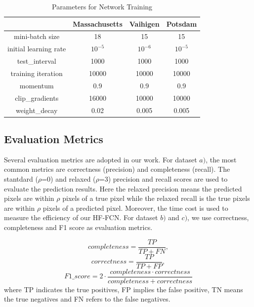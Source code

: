 \begin{table}
\centering
\caption {Parameters for Network Training}
\label{table:Train-Parameter}
\begin{tabular}{c|c|c|c}
\hline
&Massachusetts &Vaihigen &Potsdam\\  \hline
mini-batch size & 18& 15 & 15 \\
initial learning rate & $10^{-5}$ & $10^{-6}$ & $10^{-5}$\\
test\_interval&1000 & 1000 &1000\\
training iteration & 10000 & 10000& 10000\\
momentum & 0.9 & 0.9 & 0.9\\
clip\_gradients & 16000& 10000 & 10000\\
weight\_decay & 0.02& 0.005 & 0.005\\ \hline
\end{tabular}
\end{table}

\subsection{Evaluation Metrics}
Several evaluation metrics are adopted in our work. For dataset ${a)}$, the most common metrics are correctness (precision) and completeness (recall).
The stantdard ($\rho$=0) and relaxed ($\rho$=3) precision and recall scores are used to evaluate the prediction results. Here the relaxed precision means the predicted pixels are within $\rho$ pixels of a true pixel while the relaxed recall is the true pixels are within $\rho$ pixels of a predicted pixel. Moreover, the time cost is used to measure the efficiency of our HF-FCN. For dataset ${b)}$ and ${c)}$, we use correctness, completeness and F1 score as evaluation metrics.


\begin{equation}
 {completeness} = \frac{TP}{TP+FN},
\end{equation}
\begin{equation}
{correctness} = \frac{TP}{TP+FP},
\end{equation}
\begin{equation}
{F1\_score}= 2\cdot\frac{completeness\cdot correctness}{completeness+correctness}
\end{equation}
%
where TP indicates the true positives, FP implies the false positive, TN means the true negatives and FN refers to the false negatives.
